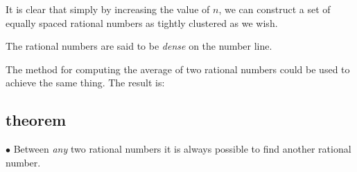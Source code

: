\documentclass[11pt, oneside]{article}
\begin{document}
It is clear that simply by increasing the value of $n$, we can construct a set of equally spaced rational numbers as tightly clustered as we wish.

The rational numbers are said to be \emph{dense} on the number line.  

The method for computing the average of two rational numbers could be used to achieve the same thing.  The result is:

\subsection*{theorem}

$\bullet$  Between \emph{any} two rational numbers it is always possible to find another rational number.  
\end{document}
